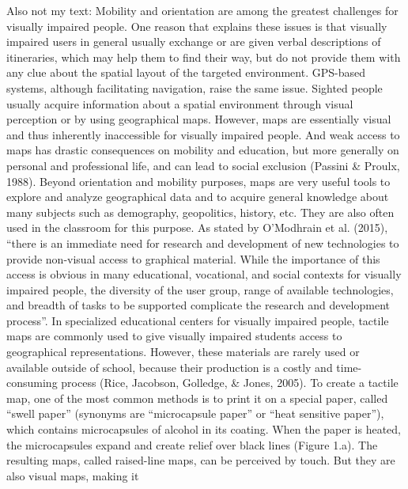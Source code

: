 
\ac{
Also not my text:

Mobility and orientation are  among the greatest challenges for visually impaired people.  One reason that explains these issues is that visually impaired users in general usually exchange or are given verbal descriptions of itineraries, which may help them to find their way, but do not provide them with  any  clue  about the  spatial  layout  of  the targeted  environment. GPS-based  systems,  although  facilitating  navigation,  raise  the  same  issue.  Sighted  people  usually acquire information about a spatial environment through visual perception or by using geographical maps.  However,  maps  are  essentially  visual  and  thus  inherently  inaccessible  for visually  impaired people.  And  weak access to  maps has drastic  consequences  on mobility  and  education, but  more generally on personal and professional life, and can lead to social exclusion (Passini & Proulx, 1988).  Beyond  orientation  and  mobility  purposes,  maps  are  very  useful  tools  to  explore  and  analyze geographical  data  and  to  acquire  general  knowledge  about  many  subjects  such  as  demography, geopolitics,  history,  etc. They  are  also often  used in  the classroom  for this  purpose. As  stated  by O’Modhrain  et  al.  (2015),  “there  is  an  immediate  need  for  research  and  development  of  new technologies to provide non-visual access to graphical material. While the importance of this access is  obvious  in  many  educational,  vocational,  and  social  contexts  for  visually  impaired  people,  the diversity of  the user group,  range  of available technologies, and  breadth  of tasks to  be  supported complicate the research and development process”.  In specialized educational centers for visually  impaired people,  tactile  maps are  commonly used  to give visually impaired students access to geographical representations. However, these materials are rarely used or available outside  of  school, because their  production  is a  costly and time-consuming process (Rice, Jacobson, Golledge, & Jones, 2005). To create a tactile map, one of the most common methods is to print it on a special paper, called “swell paper” (synonyms are “microcapsule paper” or “heat sensitive  paper”), which contains microcapsules  of alcohol  in  its coating.  When the  paper  is heated, the microcapsules expand and create relief over black lines (Figure 1.a). The resulting maps, called raised-line maps, can be perceived by touch. But they are also visual maps, making it }
